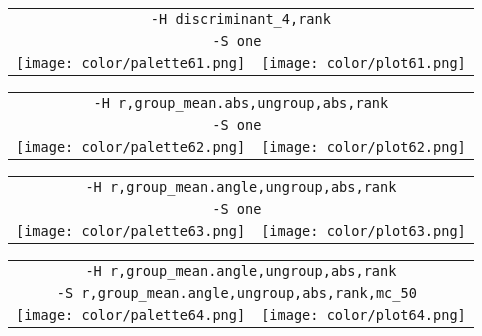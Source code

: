 \documentclass{article}
\begin{document}
\begin{center}
\begin{tabular}{m{8cm}m{8cm}}
\multicolumn{2}{c}{\tt -H discriminant\_4,rank} \\
\multicolumn{2}{c}{\tt -S one } \\
\texttt{[image: color/palette61.png]} &
\texttt{[image: color/plot61.png]}
\end{tabular}
\end{center}

\begin{center}
\begin{tabular}{m{8cm}m{8cm}}
\multicolumn{2}{c}{\tt -H r,group\_mean.abs,ungroup,abs,rank} \\
\multicolumn{2}{c}{\tt -S one } \\
\texttt{[image: color/palette62.png]} &
\texttt{[image: color/plot62.png]}
\end{tabular}
\end{center}

\begin{center}
\begin{tabular}{m{8cm}m{8cm}}
\multicolumn{2}{c}{\tt -H r,group\_mean.angle,ungroup,abs,rank} \\
\multicolumn{2}{c}{\tt -S one } \\
\texttt{[image: color/palette63.png]} &
\texttt{[image: color/plot63.png]}
\end{tabular}
\end{center}

\begin{center}
\begin{tabular}{m{8cm}m{8cm}}
\multicolumn{2}{c}{\tt -H r,group\_mean.angle,ungroup,abs,rank} \\
\multicolumn{2}{c}{\tt -S r,group\_mean.angle,ungroup,abs,rank,mc\_50 } \\
\texttt{[image: color/palette64.png]} &
\texttt{[image: color/plot64.png]}
\end{tabular}
\end{center}
\end{document}
